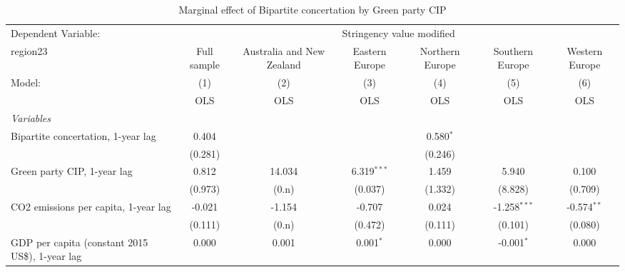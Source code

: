 
\begin{table}[htbp]
   \caption{Marginal effect of Bipartite concertation by Green party CIP}
   \centering
   \begin{tabular}{lcccccc}
      \toprule
      Dependent Variable: & \multicolumn{6}{c}{Stringency value modified}\\
      region23                                                         & Full sample   & Australia and New Zealand & Eastern Europe & Northern Europe & Southern Europe & Western Europe \\   
      Model:                                                           & (1)           & (2)                       & (3)            & (4)             & (5)             & (6)\\  
                                                                       &  OLS          & OLS                       & OLS            & OLS             & OLS             & OLS\\  
      \midrule
      \emph{Variables}\\
      Bipartite concertation, 1-year lag                               & 0.404         &                           &                & 0.580$^{*}$     &                 &   \\   
                                                                       & (0.281)       &                           &                & (0.246)         &                 &   \\   
      Green party CIP, 1-year lag                                      & 0.812         & 14.034                    & 6.319$^{***}$  & 1.459           & 5.940           & 0.100\\   
                                                                       & (0.973)       & (0.n)                     & (0.037)        & (1.332)         & (8.828)         & (0.709)\\   
      CO2 emissions per capita, 1-year lag                             & -0.021        & -1.154                    & -0.707         & 0.024           & -1.258$^{***}$  & -0.574$^{**}$\\   
                                                                       & (0.111)       & (0.n)                     & (0.472)        & (0.111)         & (0.101)         & (0.080)\\   
      GDP per capita (constant 2015 US\$), 1-year lag                  & 0.000         & 0.001                     & 0.001$^{*}$    & 0.000           & -0.001$^{*}$    & 0.000\\   

\end{tabular}
\end{table}
